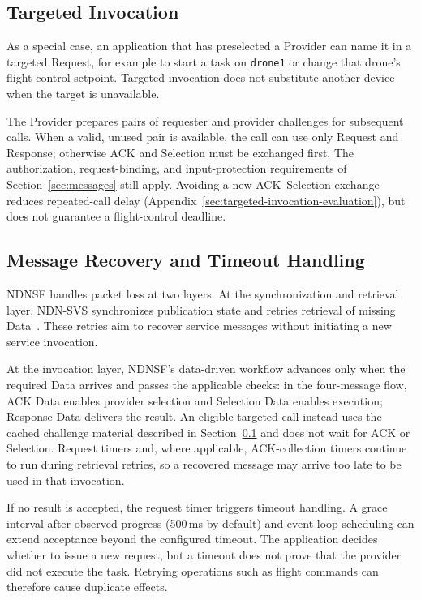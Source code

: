 

\subsection{Targeted Invocation}
\label{sec:targeted-invocation}

As a special case, an application that has preselected a Provider can name it in a targeted Request, for example to start a task on \texttt{drone1} or change that drone's flight-control setpoint. Targeted invocation does not substitute another device when the target is unavailable.

The Provider prepares pairs of requester and provider challenges for subsequent calls. When a valid, unused pair is available, the call can use only Request and Response; otherwise ACK and Selection must be exchanged first. The authorization, request-binding, and input-protection requirements of Section~\ref{sec:messages} still apply. Avoiding a new ACK--Selection exchange reduces repeated-call delay (Appendix~\ref{sec:targeted-invocation-evaluation}), but does not guarantee a flight-control deadline.


\subsection{Message Recovery and Timeout Handling}
\label{sec:loss-timeout}

NDNSF handles packet loss at two layers. At the synchronization and retrieval layer, NDN-SVS synchronizes publication state and retries retrieval of missing Data~\cite{moll2021svs,ndnsvs-github}. These retries aim to recover service messages without initiating a new service invocation.

At the invocation layer, NDNSF's data-driven workflow advances only when the required Data arrives and passes the applicable checks: in the four-message flow, ACK Data enables provider selection and Selection Data enables execution; Response Data delivers the result. An eligible targeted call instead uses the cached challenge material described in Section~\ref{sec:targeted-invocation} and does not wait for ACK or Selection. Request timers and, where applicable, ACK-collection timers continue to run during retrieval retries, so a recovered message may arrive too late to be used in that invocation.

If no result is accepted, the request timer triggers timeout handling. A grace interval after observed progress (500\,ms by default) and event-loop scheduling can extend acceptance beyond the configured timeout. The application decides whether to issue a new request, but a timeout does not prove that the provider did not execute the task. Retrying operations such as flight commands can therefore cause duplicate effects.

